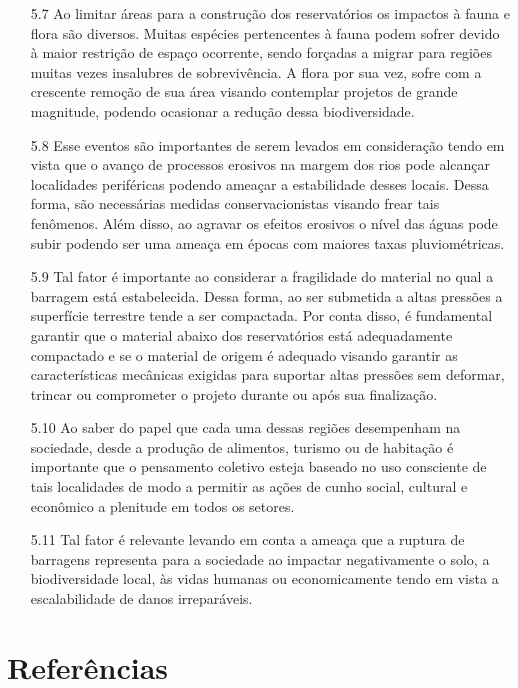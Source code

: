 \documentclass[a4paper, 12pt]{article}
\begin{document}
\begin{enumerate}
        \item[5.7] Ao limitar áreas para a construção dos reservatórios os impactos à fauna e flora são diversos. Muitas espécies pertencentes à fauna podem sofrer devido à maior restrição de espaço ocorrente, sendo forçadas a migrar para regiões muitas vezes insalubres de sobrevivência. A flora por sua vez, sofre com a crescente remoção de sua área visando contemplar projetos de grande magnitude, podendo ocasionar a redução dessa biodiversidade.
        
        \item[5.8] Esse eventos são importantes de serem levados em consideração tendo em vista que o avanço de processos erosivos na margem dos rios pode alcançar localidades periféricas podendo ameaçar a estabilidade desses locais. Dessa forma, são necessárias medidas conservacionistas visando frear tais fenômenos. Além disso, ao agravar os efeitos erosivos o nível das águas pode subir podendo ser uma ameaça em épocas com maiores taxas pluviométricas.
        
        \item[5.9] Tal fator é importante ao considerar a fragilidade do material no qual a barragem está estabelecida. Dessa forma, ao ser submetida a altas pressões a superfície terrestre tende a ser compactada. Por conta disso, é fundamental garantir que o material abaixo dos reservatórios está adequadamente compactado e se o material de origem é adequado visando garantir as características mecânicas exigidas para suportar altas pressões sem deformar, trincar ou comprometer o projeto durante ou após sua finalização.
        
        \item[5.10] Ao saber do papel que cada uma dessas regiões desempenham na sociedade, desde a produção de alimentos, turismo ou de habitação é importante que o pensamento coletivo esteja baseado no uso consciente de tais localidades de modo a permitir as ações de cunho social, cultural e econômico a plenitude em todos os setores.  
        
        \item[5.11] Tal fator é relevante levando em conta a ameaça que a ruptura de barragens representa para a sociedade ao impactar negativamente o solo, a biodiversidade local, às vidas humanas ou economicamente tendo em vista a escalabilidade de danos irreparáveis.
    \end{enumerate}
	\newpage

	\section{\textbf{Referências}}
\end{document}
